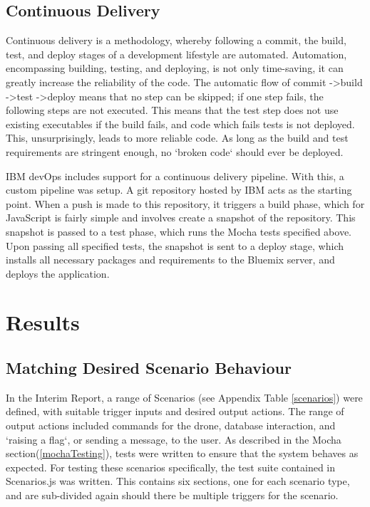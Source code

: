 \documentclass{article}
\begin{document}
\subsection{Continuous Delivery} \label{ContinuousDelivery}
Continuous delivery is a methodology, whereby following a commit, the build, test, and deploy stages of a development lifestyle are automated. Automation, encompassing building, testing, and deploying, is not only time-saving, it can greatly increase the reliability of the code. The automatic flow of commit -\textgreater build -\textgreater test -\textgreater deploy means that no step can be skipped; if one step fails, the following steps are not executed. This means that the test step does not use existing executables if the build fails, and code which fails tests is not deployed. This, unsurprisingly, leads to more reliable code. As long as the build and test requirements are stringent enough, no `broken code` should ever be deployed\cite{co475}.

IBM devOps includes support for a continuous delivery pipeline. With this, a custom pipeline was setup. A git repository hosted by IBM acts as the starting point. When a push is made to this repository, it triggers a build phase, which for JavaScript is fairly simple and involves create a snapshot of the repository. This snapshot is passed to a test phase, which runs the Mocha tests specified above. Upon passing all specified tests, the snapshot is sent to a deploy stage, which installs all necessary packages and requirements to the Bluemix server, and deploys the application. 




\section{Results}

\subsection{Matching Desired Scenario Behaviour}\label{resultsScenarios}
In the Interim Report, a range of Scenarios (see Appendix Table \ref{scenarios}) were defined, with suitable trigger inputs and desired output actions. The range of output actions included commands for the drone, database interaction, and `raising a flag`, or sending a message, to the user. As described in the Mocha section(\ref{mochaTesting}), tests were written to ensure that the system behaves as expected. For testing these scenarios specifically, the test suite contained in Scenarios.js was written. This contains six sections, one for each scenario type, and are sub-divided again should there be multiple triggers for the scenario. 
\end{document}
